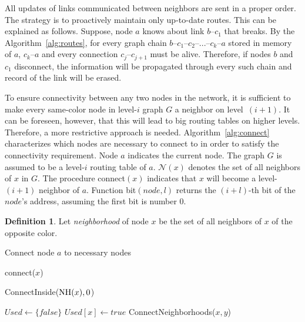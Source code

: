 \documentclass[conference]{IEEEtran}
\theoremstyle{definition}
\newtheorem{defn}{Definition}
\newcommand{\cN}{{\mathcal{N}}}
\begin{document}
All updates of links communicated between neighbors are sent in a proper order. The strategy is to proactively maintain only up-to-date routes. This can be explained as follows. Suppose, node $a$ knows about link $b$--$c_1$ that breaks. By the Algorithm~\ref{alg:routes}, for every graph chain $b$--$c_1$--$c_2$--...--$c_k$--$a$ stored in memory of $a$, $c_k$--$a$ and every connection $c_j$--$c_{j+1}$ must be alive. Therefore, if nodes $b$ and $c_1$ disconnect, the information will be propagated through every such chain and record of the link will be erased.

To ensure connectivity between any two nodes in the network, it is sufficient to make every same-color node in level-$i$ graph $G$ a neighbor on level~$(i+1)$. It can be foreseen, however, that this will lead to big routing tables on higher levels. Therefore, a more restrictive approach is needed. Algorithm~\ref{alg:connect} characterizes which nodes are necessary to connect to in order to satisfy the connectivity requirement. Node $a$ indicates the current node. The graph $G$ is assumed to be a level-$i$ routing table of $a$. $\cN(x)$ denotes the set of all neighbors of $x$ in $G$. The procedure  connect$(x)$ indicates that $x$ will become a level-$(i+1)$ neighbor of $a$. Function bit$(node, l)$ returns the $(i + l)$-th bit of the $node$'s address, assuming the first bit is number 0.

\begin{defn}
    Let \emph{neighborhood} of node $x$ be the set of all neighbors of $x$ of the opposite color.
    
    \label{defn:neighborhood}
\end{defn}

\begin{algorithm}
    \begin{algorithmic}[1]
        \caption{Connect node $a$ to necessary nodes}
        \label{alg:connect}

            \For {$ x \in \cN(a) \setminus {\rm NH}(a) $}
                \State connect($x$)
            \EndFor

                \State ConnectInside(${\rm NH}(x), 0$)

                \For {$ y \in \cN(x) \setminus {\rm NH}(x) $}
                    \State $Used \gets \{false\}$
                    \State $Used[x] \gets true$
                    \State ConnectNeighborhoods($x, y$)
                \EndFor
            \EndFor
        \EndProcedure
        
    \end{algorithmic}
\end{algorithm}
\end{document}
